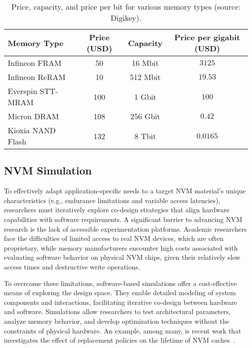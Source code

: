 \documentclass[manuscript,screen]{acmart}
\begin{document}
\begin{table}[h!]
    \centering
    \begin{tabular}{|l|c|c|c|}
        \hline
        \textbf{Memory Type} & \textbf{Price (USD)} & \textbf{Capacity} & \textbf{Price per gigabit (USD)} \\ \hline
        Infineon FRAM        & 50                  & 16 Mbit           & $3125 $ \\ \hline
        Infineon ReRAM        & 10                  & 512 Mbit          & $19.53$ \\ \hline
        Everspin STT-MRAM    & 100                 & 1 Gbit            & $100$ \\ \hline
        Micron DRAM          & 108                 & 256 Gbit          & $0.42 $ \\ \hline
        Kioxia NAND Flash    & 132                 & 8 Tbit            & $0.0165$ \\ \hline
    \end{tabular}
    \caption{Price, capacity, and price per bit for various memory types (source: Digikey).}
    \label{table:price_per_bit}
\end{table}

\subsection{NVM Simulation}
\label{subsec:nvm-simulation}
To effectively adapt application-specific needs to a target NVM material’s unique characteristics (e.g., endurance limitations and variable access latencies), researchers must iteratively explore co-design strategies that align hardware capabilities with software requirements.  
A significant barrier to advancing NVM research is the lack of accessible experimentation platforms. Academic researchers face the difficulties of limited access to real NVM devices, which are often proprietary, while memory manufacturers encounter high costs associated with evaluating software behavior on physical NVM chips, given their relatively slow access times and destructive write operations.



To overcome these limitations, software-based simulations offer a cost-effective means of exploring the design space. They enable detailed modeling of system components and interactions, facilitating iterative co-design between hardware and software. Simulations allow researchers to test architectural parameters, analyze memory behavior, and develop optimization techniques without the constraints of physical hardware.
An example, among many, is recent work that investigates the effect of replacement policies on the lifetime of NVM caches~\cite{escuin_hpca23}. 
\end{document}
